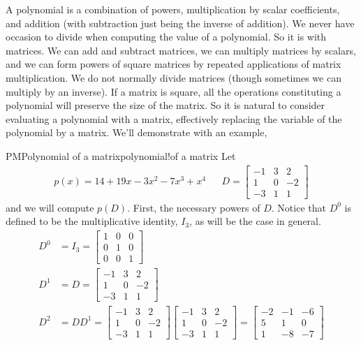 %
%
A polynomial is a combination of powers, multiplication by scalar coefficients, and addition (with subtraction just being the inverse of addition).  We never have occasion to divide when computing the value of a polynomial.  So it is with matrices.  We can add and subtract matrices, we can multiply matrices by scalars, and we can form powers of square matrices by repeated applications of matrix multiplication.  We do not normally divide matrices (though sometimes we can multiply by an inverse).  If a matrix is square, all the operations constituting a polynomial will preserve the size of the matrix.  So it is natural to consider evaluating a polynomial with a matrix, effectively replacing the variable of the polynomial by a matrix.  We'll demonstrate with an example,
%
\begin{example}{PM}{Polynomial of a matrix}{polynomial!of a matrix}
Let
%
\begin{align*}
p(x)=14+19x-3x^2-7x^3+x^4
&&
D=\begin{bmatrix}-1 & 3 & 2\\1 & 0 & -2\\-3 & 1 & 1\end{bmatrix}
\end{align*}
%
and we will compute $p(D)$.  First, the necessary powers of $D$.  Notice that $D^0$ is defined to be the multiplicative identity, $I_3$, as will be the case in general.
%
\begin{align*}
D^0&=I_3=\begin{bmatrix}1 & 0 & 0\\0 & 1 & 0\\0 & 0 & 1\end{bmatrix}\\
%
D^1&=D=\begin{bmatrix}-1 & 3 & 2\\1 & 0 & -2\\-3 & 1 & 1\end{bmatrix}\\
%
D^2&=DD^1=
\begin{bmatrix}-1 & 3 & 2\\1 & 0 & -2\\-3 & 1 & 1\end{bmatrix}
\begin{bmatrix}-1 & 3 & 2\\1 & 0 & -2\\-3 & 1 & 1\end{bmatrix}
=
\begin{bmatrix}-2 & -1 & -6\\5 & 1 & 0\\1 & -8 & -7\end{bmatrix}\\

\end{align*}
\end{example}
